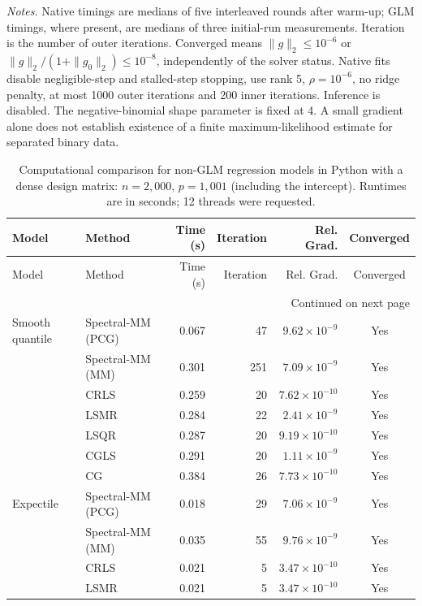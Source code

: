 \noindent\textit{Notes.} Native timings are medians of five interleaved rounds after warm-up; GLM timings, where present, are medians of three initial-run measurements. Iteration is the number of outer iterations. Converged means $\|g\|_2\leq10^{-6}$ or $\|g\|_2/(1+\|g_0\|_2)\leq10^{-8}$, independently of the solver status. Native fits disable negligible-step and stalled-step stopping, use rank 5, $\rho=10^{-6}$, no ridge penalty, at most 1000 outer iterations and 200 inner iterations. Inference is disabled.
The negative-binomial shape parameter is fixed at 4. A small gradient alone does not establish existence of a finite maximum-likelihood estimate for separated binary data.
\par
\endgroup

\clearpage
\begingroup
\small
\setlength{\tabcolsep}{5pt}
\begin{longtable}{llrrrc}
\caption{Computational comparison for non-GLM regression models in Python with a dense design matrix: $n=2{,}000$, $p=1{,}001$ (including the intercept). Runtimes are in seconds; 12 threads were requested.}
\label{tab:python-dense-nonglm-strict}\\
\toprule
Model & Method & Time (s) & Iteration & Rel. Grad. & Converged \\
\midrule
\endfirsthead
\toprule
Model & Method & Time (s) & Iteration & Rel. Grad. & Converged \\
\midrule
\endhead
\midrule
\multicolumn{6}{r}{Continued on next page}\\
\endfoot
\bottomrule
\endlastfoot
Smooth quantile & Spectral-MM (PCG) & 0.067 & 47 & $9.62\times10^{-9}$ & Yes \\
 & Spectral-MM (MM) & 0.301 & 251 & $7.09\times10^{-9}$ & Yes \\
 & CRLS & 0.259 & 20 & $7.62\times10^{-10}$ & Yes \\
 & LSMR & 0.284 & 22 & $2.41\times10^{-9}$ & Yes \\
 & LSQR & 0.287 & 20 & $9.19\times10^{-10}$ & Yes \\
 & CGLS & 0.291 & 20 & $1.11\times10^{-9}$ & Yes \\
 & CG & 0.384 & 26 & $7.73\times10^{-10}$ & Yes \\
\midrule
Expectile & Spectral-MM (PCG) & 0.018 & 29 & $7.06\times10^{-9}$ & Yes \\
 & Spectral-MM (MM) & 0.035 & 55 & $9.76\times10^{-9}$ & Yes \\
 & CRLS & 0.021 & 5 & $3.47\times10^{-10}$ & Yes \\
 & LSMR & 0.021 & 5 & $3.47\times10^{-10}$ & Yes \\

\end{longtable}

